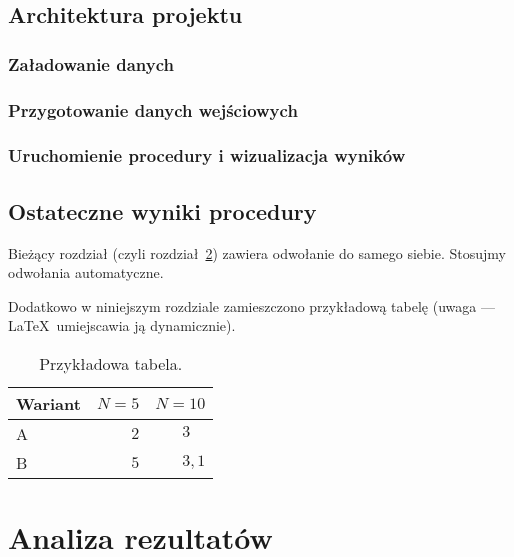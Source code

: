 \documentclass[12pt,a4paper,twoside,openany]{book}
\begin{document}
\section{Architektura projektu}

\subsection{Załadowanie danych}

\subsection{Przygotowanie danych wejściowych}

\subsection{Uruchomienie procedury i wizualizacja wyników}

\section{Ostateczne wyniki procedury}
\label{sec:nast}

Bieżący rozdział (czyli rozdział~\ref{sec:nast}) zawiera odwołanie do samego siebie. Stosujmy odwołania automatyczne.

Dodatkowo w niniejszym rozdziale zamieszczono przykładową tabelę (uwaga --- \LaTeX\ umiejscawia ją dynamicznie).



\begin{table}[h]
\centering
\caption{Przykładowa tabela.}
\label{tab:przyklad}
\footnotesize
\begin{tabular}{|l|r|r|}
\hline
Wariant & $N=5$ & $N=10$\\
\hline
A & $2$ & $3\phantom{{,}1}$ \\
B & $5$ & $3{,}1$ \\

\hline
\end{tabular} 
\end{table}

\clearpage

\chapter{Analiza rezultatów}
\end{document}
